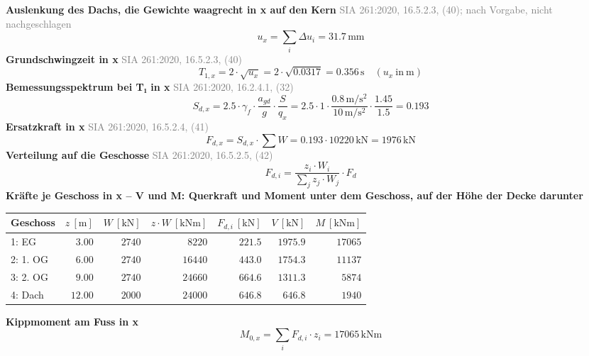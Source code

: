 \documentclass[11pt,a4paper]{article}
\newcommand{\normref}[1]{{\small\textcolor{gray}{#1}}}
\begin{document}
\noindent\textbf{Auslenkung des Dachs, die Gewichte waagrecht in x auf den Kern} \hfill \normref{SIA 261:2020, 16.5.2.3, (40); nach Vorgabe, nicht nachgeschlagen}
\begin{equation*}
u_x = \sum_i \Delta u_i = 31.7\,\mathrm{mm}
\end{equation*}
\noindent\textbf{Grundschwingzeit in x} \hfill \normref{SIA 261:2020, 16.5.2.3, (40)}
\begin{equation*}
T_{1,x} = 2 \cdot \sqrt{u_x} = 2 \cdot \sqrt{0.0317} = 0.356\,\mathrm{s} \quad \left(u_x\ \text{in}\ \mathrm{m}\right)
\end{equation*}
\noindent\textbf{Bemessungsspektrum bei T₁ in x} \hfill \normref{SIA 261:2020, 16.2.4.1, (32)}
\begin{equation*}
S_{d,x} = 2.5 \cdot \gamma_f \cdot \frac{a_{gd}}{g} \cdot \frac{S}{q_x} = 2.5 \cdot 1 \cdot \frac{0.8\,\mathrm{m}/\mathrm{s}^{2}}{10\,\mathrm{m}/\mathrm{s}^{2}} \cdot \frac{1.45}{1.5} = 0.193
\end{equation*}
\noindent\textbf{Ersatzkraft in x} \hfill \normref{SIA 261:2020, 16.5.2.4, (41)}
\begin{equation*}
F_{d,x} = S_{d,x} \cdot \sum W = 0.193 \cdot 10220\,\mathrm{kN} = 1976\,\mathrm{kN}
\end{equation*}
\noindent\textbf{Verteilung auf die Geschosse} \hfill \normref{SIA 261:2020, 16.5.2.5, (42)}
\begin{equation*}
F_{d,i} = \frac{z_i \cdot W_i}{\sum_j z_j \cdot W_j} \cdot F_d
\end{equation*}
\noindent\textbf{Kräfte je Geschoss in x – V und M: Querkraft und Moment unter dem Geschoss, auf der Höhe der Decke darunter}
\begin{longtable}{lrrrrrr}
\hline
Geschoss & $z\ [\mathrm{m}]$ & $W\ [\mathrm{kN}]$ & $z \cdot W\ [\mathrm{kNm}]$ & $F_{d,i}\ [\mathrm{kN}]$ & $V\ [\mathrm{kN}]$ & $M\ [\mathrm{kNm}]$ \\
\hline
\endhead
1: EG & $3.00$ & $2740$ & $8220$ & $221.5$ & $1975.9$ & $17065$ \\
2: 1. OG & $6.00$ & $2740$ & $16440$ & $443.0$ & $1754.3$ & $11137$ \\
3: 2. OG & $9.00$ & $2740$ & $24660$ & $664.6$ & $1311.3$ & $5874$ \\
4: Dach & $12.00$ & $2000$ & $24000$ & $646.8$ & $646.8$ & $1940$ \\
\hline
\end{longtable}
\noindent\textbf{Kippmoment am Fuss in x}
\begin{equation*}
M_{0,x} = \sum_i F_{d,i} \cdot z_i = 17065\,\mathrm{kNm}
\end{equation*}
\end{document}
